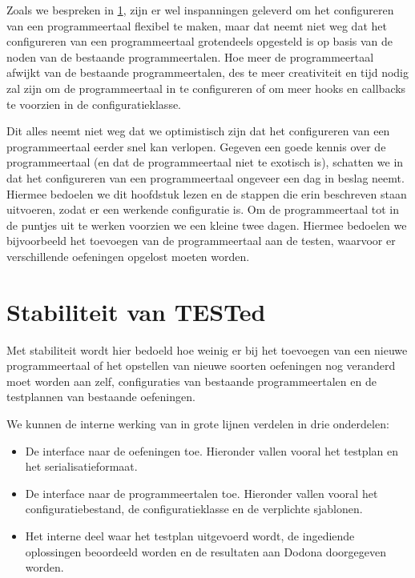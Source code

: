 Zoals we bespreken in \cref{sec:stabiliteit-van-tested}, zijn er wel inspanningen geleverd om het configureren van een programmeertaal flexibel te maken, maar dat neemt niet weg dat het configureren van een programmeertaal grotendeels opgesteld is op basis van de noden van de bestaande programmeertalen.
Hoe meer de programmeertaal afwijkt van de bestaande programmeertalen, des te meer creativiteit en tijd nodig zal zijn om de programmeertaal in \tested{} te configureren of om meer hooks en callbacks te voorzien in de configuratieklasse.

Dit alles neemt niet weg dat we optimistisch zijn dat het configureren van een programmeertaal eerder snel kan verlopen.
Gegeven een goede kennis over de programmeertaal (en dat de programmeertaal niet te exotisch is), schatten we in dat het configureren van een programmeertaal ongeveer een dag in beslag neemt.
Hiermee bedoelen we dit hoofdstuk lezen en de stappen die erin beschreven staan uitvoeren, zodat er een werkende configuratie is.
Om de programmeertaal tot in de puntjes uit te werken voorzien we een kleine twee dagen.
Hiermee bedoelen we bijvoorbeeld het toevoegen van de programmeertaal aan de testen, waarvoor er verschillende oefeningen opgelost moeten worden.


\section{Stabiliteit van TESTed}\label{sec:stabiliteit-van-tested}

Met stabiliteit wordt hier bedoeld hoe weinig er bij het toevoegen van een nieuwe programmeertaal of het opstellen van nieuwe soorten oefeningen nog veranderd moet worden aan \tested{} zelf, configuraties van bestaande programmeertalen en de testplannen van bestaande oefeningen.

We kunnen de interne werking van \tested{} in grote lijnen verdelen in drie onderdelen:

\begin{itemize}
    \item De interface naar de oefeningen toe.
    Hieronder vallen vooral het testplan en het serialisatieformaat.
    \item De interface naar de programmeertalen toe.
    Hieronder vallen vooral het configuratiebestand, de configuratieklasse en de verplichte sjablonen.
    \item Het interne deel waar het testplan uitgevoerd wordt, de ingediende oplossingen beoordeeld worden en de resultaten aan Dodona doorgegeven worden.
\end{itemize}


